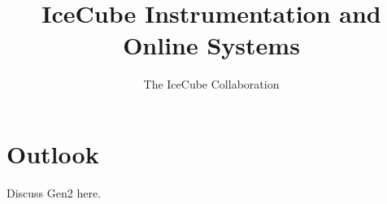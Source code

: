 \documentclass[11pt]{article} %
\title{IceCube Instrumentation and Online Systems}
\author{The IceCube Collaboration}
\date{}
\begin{document}
\maketitle


\clearpage


\clearpage


\clearpage


\clearpage


\clearpage

\section{Outlook}
Discuss Gen2 here.



\end{document}
